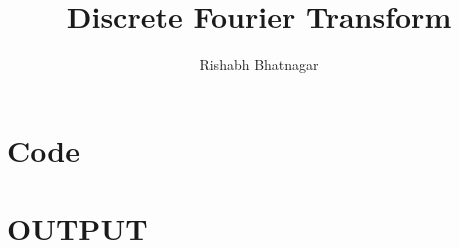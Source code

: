 \documentclass[a4paper]{article}
\begin{document}
\title{Discrete Fourier Transform}
\author{Rishabh Bhatnagar}
\maketitle

\section*{Code}


\section*{OUTPUT}

\end{document}

